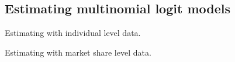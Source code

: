 
\subsection{Estimating multinomial logit models}

Estimating with individual level data.

Estimating with market share level data.


